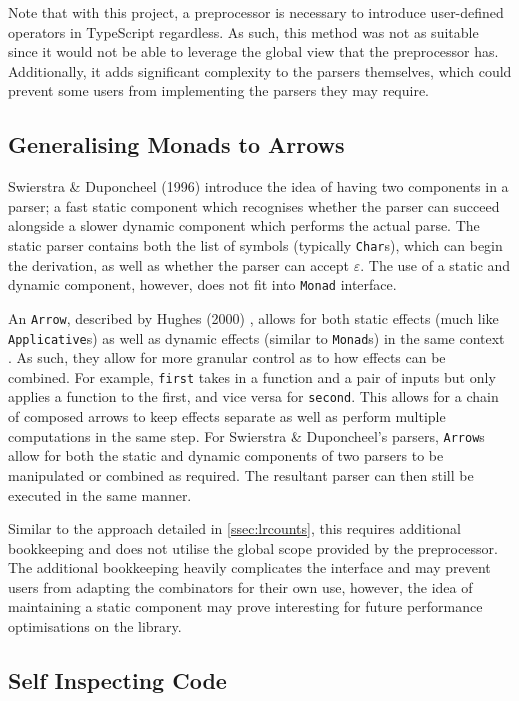 Note that with this project, a preprocessor is necessary to introduce user-defined operators in TypeScript regardless.
As such, this method was not as suitable since it would not be able to leverage the global view that the preprocessor has.
Additionally, it adds significant complexity to the parsers themselves, which could prevent some users from implementing the parsers they may require.

\subsection{Generalising Monads to Arrows}
\label{ssec:arrows}

Swierstra \& Duponcheel (1996) \cite{swierstra96} introduce the idea of having two components in a parser; a fast static component which recognises whether the parser can succeed alongside a slower dynamic component which performs the actual parse.
The static parser contains both the list of symbols (typically \texttt{Char}s), which can begin the derivation, as well as whether the parser can accept $\varepsilon$.
The use of a static and dynamic component, however, does not fit into \texttt{Monad} interface.

An \texttt{Arrow}, described by Hughes (2000) \cite{hughes00}, allows for both static effects (much like \texttt{Applicative}s) as well as dynamic effects (similar to \texttt{Monad}s) in the same context \cite{hsarrows}.
As such, they allow for more granular control as to how effects can be combined.
For example, \texttt{first} takes in a function and a pair of inputs but only applies a function to the first, and vice versa for \texttt{second}.
This allows for a chain of composed arrows to keep effects separate as well as perform multiple computations in the same step.
For Swierstra \& Duponcheel's parsers, \texttt{Arrow}s allow for both the static and dynamic components of two parsers to be manipulated or combined as required.
The resultant parser can then still be executed in the same manner.

Similar to the approach detailed in \autoref{ssec:lrcounts}, this requires additional bookkeeping and does not utilise the global scope provided by the preprocessor.
The additional bookkeeping heavily complicates the interface and may prevent users from adapting the combinators for their own use, however, the idea of maintaining a static component may prove interesting for future performance optimisations on the library.

\subsection{Self Inspecting Code}
\label{ssec:sic}

